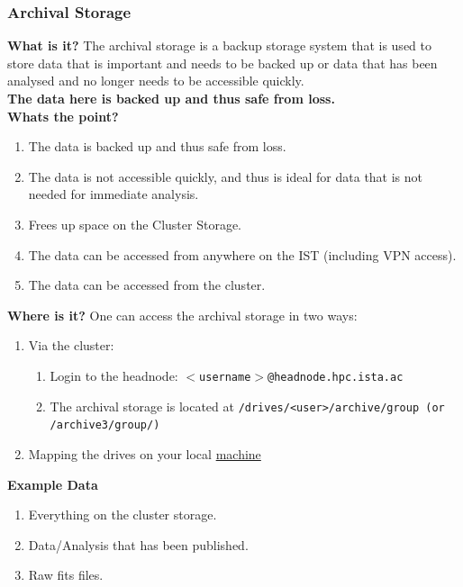 \documentclass{article}
\begin{document}
\subsubsection{Archival Storage}
\textbf{What is it?}
\newline
The archival storage is a backup storage system that is used to store data that is important and needs to be backed up or data that has been analysed and no longer needs to be accessible quickly.
\\
\textbf{The data here is backed up and thus safe from loss.}
\\

\noindent
\textbf{Whats the point?}
\newline
\begin{enumerate}
    \item The data is backed up and thus safe from loss.
    \item The data is not accessible quickly, and thus is ideal for data that is not needed for immediate analysis.
    \item Frees up space on the Cluster Storage.
    \item The data can be accessed from anywhere on the IST  (including VPN access).
    \item The data can be accessed from the cluster.
\end{enumerate}

\noindent
\textbf{Where is it?}
\newline
One can access the archival storage in two ways:
\begin{enumerate}
    \item Via the cluster: 
    \begin{enumerate}
        \item Login to the headnode: \texttt{$<$username$>$@headnode.hpc.ista.ac}
        \item The archival storage is located at \texttt{/drives/<user>/archive/group (or /archive3/group/)}
    \end{enumerate}
    \item Mapping the drives on your local \href{https://it.pages.ist.ac.at/docs/it-documentation/fileservers/fileshare/}{machine}
\end{enumerate}

\noindent
\textbf{Example Data}
\begin{enumerate}
    \item Everything on the cluster storage.
    \item Data/Analysis that has been published.
    \item Raw fits files.
\end{enumerate}
\end{document}
